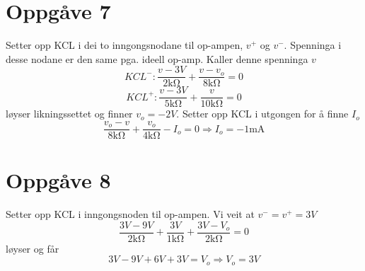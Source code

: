 \documentclass[12pt,a4paper]{article}
\begin{document}
  \section{Oppgåve 7}
    Setter opp KCL i dei to inngongsnodane til op-ampen, $v^+$ og $v^-$. Spenninga i desse
    nodane er den same pga. ideell op-amp. Kaller denne spenninga $v$
    \begin{equation}
      KCL^-: \frac{v-3V}{2\si{\kilo\ohm}} + \frac{v-v_o}{8\si{\kilo\ohm}} = 0
    \end{equation}
    \begin{equation}
      KCL^+: \frac{v-3V}{5\si{\kilo\ohm}} + \frac{v}{10\si{\kilo\ohm}} = 0
    \end{equation}
    løyser likningssettet og finner $v_o = -2V$. Setter opp KCL i utgongen for å finne $I_o$
    \begin{equation}
      \frac{v_o-v}{8\si{\kilo\ohm}} + \frac{v_o}{4\si{\kilo\ohm}} - I_o = 0 
      \Rightarrow I_o = -1\si{\milli\ampere}
    \end{equation}

  \section{Oppgåve 8}
    Setter opp KCL i inngongsnoden til op-ampen. Vi veit at $v^- = v^+ = 3V$
    \begin{equation}
      \frac{3V-9V}{2\si{\kilo\ohm}} + \frac{3V}{1\si{\kilo\ohm}} +
      \frac{3V-V_o}{2\si{\kilo\ohm}} = 0
    \end{equation}
    løyser og får
    \begin{equation}
      3V - 9V + 6V + 3V = V_o \Rightarrow V_o = 3V
    \end{equation}

  \newpage
\end{document}
